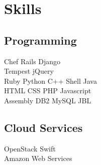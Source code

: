 \documentclass[letterpaper]{resume} %
\begin{document}
\begin{minipage}[t]{0.33\textwidth}
\section{Skills}

\subsection{Programming}

Chef \textbullet{} Rails \textbullet{} Django \\
Tempest \textbullet{} jQuery \\ 
Ruby \textbullet{} Python \textbullet{} C++ \textbullet{} Shell \textbullet{} Java\\
HTML \textbullet{} CSS \textbullet{} PHP \textbullet{} Javascript \\
Assembly \textbullet{} DB2 \textbullet{} MySQL \textbullet{} JBL

\sectionspace %

\subsection{Cloud Services}
OpenStack Swift \\
Amazon Web Services


\end{minipage} %
\hfill
%
%
\end{document}
